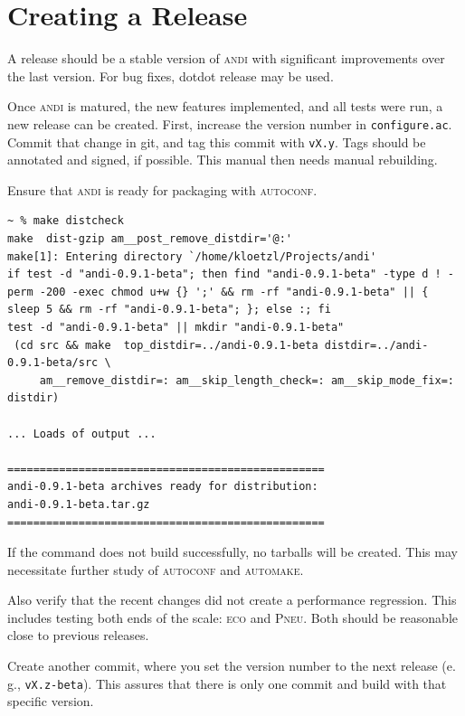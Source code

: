 \documentclass[a4paper,
  10pt,
  english,
  DIV=12,
  BCOR=8mm]{scrbook}
\newcommand{\algo}[1]{\textsc{{#1}}}
\newcommand{\andi}{\algo{andi}\xspace}
\newcommand{\eco}{\textsc{eco}\oldstylenums{29}\xspace}
\newcommand{\pneu}{\textsc{Pneu}\oldstylenums{3085}\xspace}
\begin{document}
\section{Creating a Release}

A release should be a stable version of \andi with significant improvements over the last version. For bug fixes, dotdot release may be used.


Once \andi is matured, the new features implemented, and all tests were run, a new release can be created. First, increase the version number in \lstinline$configure.ac$. Commit that change in git, and tag this commit with \lstinline$vX.y$. Tags should be annotated and signed, if possible. This manual then needs manual rebuilding.

Ensure that \andi is ready for packaging with \algo{autoconf}.

\begin{lstlisting}
~ % make distcheck
make  dist-gzip am__post_remove_distdir='@:'
make[1]: Entering directory `/home/kloetzl/Projects/andi'
if test -d "andi-0.9.1-beta"; then find "andi-0.9.1-beta" -type d ! -perm -200 -exec chmod u+w {} ';' && rm -rf "andi-0.9.1-beta" || { sleep 5 && rm -rf "andi-0.9.1-beta"; }; else :; fi
test -d "andi-0.9.1-beta" || mkdir "andi-0.9.1-beta"
 (cd src && make  top_distdir=../andi-0.9.1-beta distdir=../andi-0.9.1-beta/src \
     am__remove_distdir=: am__skip_length_check=: am__skip_mode_fix=: distdir)

... Loads of output ...

=================================================
andi-0.9.1-beta archives ready for distribution: 
andi-0.9.1-beta.tar.gz
=================================================
\end{lstlisting}

If the command does not build successfully, no tarballs will be created. This may necessitate further study of \algo{autoconf} and \algo{automake}.

Also verify that the recent changes did not create a performance regression. This includes testing both ends of the scale: \eco and \pneu. Both should be reasonable close to previous releases.

Create another commit, where you set the version number to the next release (e.\,g., \lstinline$vX.z-beta$). This assures that there is only one commit and build with that specific version.

\backmatter

\end{document}
